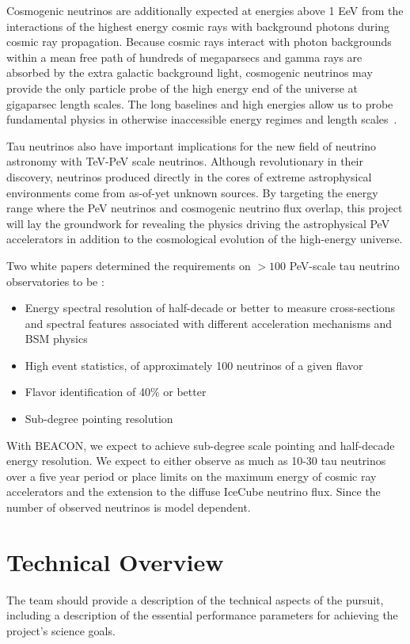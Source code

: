 \documentclass[12pt]{article}
\begin{document}
Cosmogenic neutrinos are additionally expected at energies above 1 EeV from the interactions of the highest energy cosmic rays with background photons during cosmic ray propagation. Because cosmic rays interact with photon backgrounds within a mean free path of hundreds of megaparsecs and gamma rays are absorbed by the extra galactic background light, cosmogenic neutrinos may provide the only particle probe of the high energy end of the universe at gigaparsec length scales. The long baselines and high energies allow us to probe fundamental physics in otherwise inaccessible energy regimes and length scales~\cite{astro2020_fundamental}.

Tau neutrinos also have important implications for the new field of neutrino astronomy with TeV-PeV scale neutrinos. Although revolutionary in their discovery, neutrinos produced directly in the cores of extreme astrophysical environments come from as-of-yet unknown sources. By targeting the energy range where the PeV neutrinos and cosmogenic neutrino flux overlap, this project will lay the groundwork for revealing the physics driving the astrophysical PeV accelerators in addition to the cosmological evolution of the high-energy universe.
	
Two white papers determined the requirements on $>100$ PeV-scale tau neutrino observatories to be \cite{Astro2020_fundamental, Astro2020_astrophysics}:
\begin{itemize}
	\item Energy spectral resolution of half-decade or better to measure cross-sections and spectral features associated with different acceleration mechanisms and BSM physics
	\item High event statistics, of approximately 100 neutrinos of a given flavor
	\item Flavor identification of 40\% or better
	\item Sub-degree pointing resolution
\end{itemize}


With BEACON, we expect to achieve sub-degree scale pointing and half-decade energy resolution. We expect to either observe as much as 10-30 tau neutrinos over a five year period or place limits on the maximum energy of cosmic ray accelerators and the extension to the diffuse IceCube neutrino flux.  Since the number of observed neutrinos is model dependent. 

\section{Technical Overview}
\color{blue}
The team should provide a description of the technical aspects of the pursuit, including a description of the essential performance parameters for achieving the project's science goals.
\end{document}
